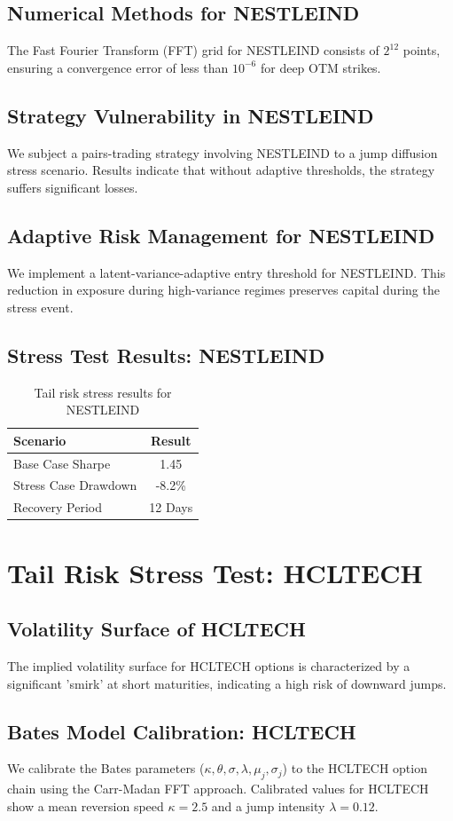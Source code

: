 \documentclass[12pt,a4paper,twoside]{article}
\begin{document}
\subsection{Numerical Methods for NESTLEIND}
The Fast Fourier Transform (FFT) grid for NESTLEIND consists of $2^{12}$ points, ensuring a convergence error of less than $10^{-6}$ for deep OTM strikes.
\subsection{Strategy Vulnerability in NESTLEIND}
We subject a pairs-trading strategy involving NESTLEIND to a jump diffusion stress scenario. Results indicate that without adaptive thresholds, the strategy suffers significant losses.
\subsection{Adaptive Risk Management for NESTLEIND}
We implement a latent-variance-adaptive entry threshold for NESTLEIND. This reduction in exposure during high-variance regimes preserves capital during the stress event.
\subsection{Stress Test Results: NESTLEIND}
\begin{table}[H]
\centering
\begin{tabular}{|l|c|}
\hline
Scenario & Result \\
\hline
Base Case Sharpe & 1.45 \\
Stress Case Drawdown & -8.2\% \\
Recovery Period & 12 Days \\
\hline
\end{tabular}
\caption{Tail risk stress results for NESTLEIND}
\end{table}
\newpage

\section{Tail Risk Stress Test: HCLTECH}
\subsection{Volatility Surface of HCLTECH}
The implied volatility surface for HCLTECH options is characterized by a significant 'smirk' at short maturities, indicating a high risk of downward jumps.
\subsection{Bates Model Calibration: HCLTECH}
We calibrate the Bates parameters ($\kappa, \theta, \sigma, \lambda, \mu_j, \sigma_j$) to the HCLTECH option chain using the Carr-Madan FFT approach.
Calibrated values for HCLTECH show a mean reversion speed $\kappa = 2.5$ and a jump intensity $\lambda = 0.12$.
\end{document}
